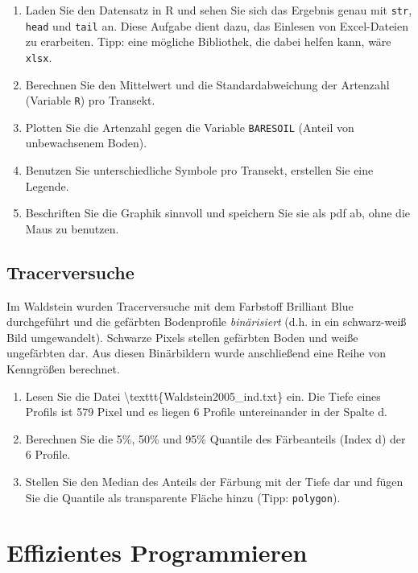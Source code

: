 \documentclass[]{book}
\providecommand{\tightlist}{%
  \setlength{\itemsep}{0pt}\setlength{\parskip}{0pt}}
\begin{document}
\begin{enumerate}
\def\labelenumi{\arabic{enumi}.}
\item
  Laden Sie den Datensatz in R und sehen Sie sich das Ergebnis genau mit \texttt{str}, \texttt{head} und \texttt{tail} an. Diese Aufgabe dient dazu, das Einlesen von Excel-Dateien zu erarbeiten. Tipp: eine mögliche Bibliothek, die dabei helfen kann, wäre \texttt{xlsx}.
\item
  Berechnen Sie den Mittelwert und die Standardabweichung der Artenzahl (Variable \texttt{R}) pro Transekt.
\item
  Plotten Sie die Artenzahl gegen die Variable \texttt{BARESOIL} (Anteil von unbewachsenem Boden).
\item
  Benutzen Sie unterschiedliche Symbole pro Transekt, erstellen Sie eine Legende.
\item
  Beschriften Sie die Graphik sinnvoll und speichern Sie sie als pdf ab, ohne die Maus zu benutzen.
\end{enumerate}

\hypertarget{tracerversuche}{%
\subsection{Tracerversuche}\label{tracerversuche}}

Im Waldstein wurden Tracerversuche mit dem Farbstoff Brilliant Blue durchgeführt und die gefärbten Bodenprofile \emph{binärisiert} (d.h. in ein schwarz-weiß Bild umgewandelt). Schwarze Pixels stellen gefärbten Boden und weiße ungefärbten dar. Aus diesen Binärbildern wurde anschließend eine Reihe von Kenngrößen berechnet.

\begin{enumerate}
\def\labelenumi{\arabic{enumi}.}
\tightlist
\item
  Lesen Sie die Datei \textbackslash{}texttt\{Waldstein2005\_ind.txt\} ein. Die Tiefe eines Profils ist 579 Pixel und es liegen 6 Profile untereinander in der Spalte d.
\item
  Berechnen Sie die 5\%, 50\% und 95\% Quantile des Färbeanteils (Index d) der 6 Profile.
\item
  Stellen Sie den Median des Anteils der Färbung mit der Tiefe dar und fügen Sie die Quantile als transparente Fläche hinzu (Tipp: \texttt{polygon}).
\end{enumerate}

\hypertarget{effizientes-programmieren}{%
\section{Effizientes Programmieren}\label{effizientes-programmieren}}
\end{document}

